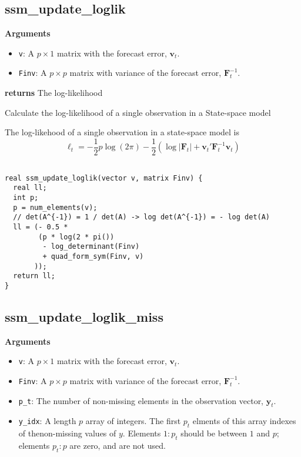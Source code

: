 \documentclass[]{book}
\providecommand{\tightlist}{%
  \setlength{\itemsep}{0pt}\setlength{\parskip}{0pt}}
\newcommand{\mat}[1]{\boldsymbol{#1}}
\renewcommand{\vec}[1]{\boldsymbol{#1}}
\begin{document}
\subsection{ssm\_update\_loglik}\label{ssm_update_loglik}

\textbf{Arguments}

\begin{itemize}
\tightlist
\item
  \texttt{v}: A \(p \times 1\) matrix with the forecast error,
  \(\vec{v}_t\).
\item
  \texttt{Finv}: A \(p \times p\) matrix with variance of the forecast
  error, \(\mat{F}^{-1}_t\).
\end{itemize}

\textbf{returns} The log-likelihood

Calculate the log-likelihood of a single observation in a State-space
model

The log-likehood of a single observation in a state-space model is \[
\ell_t = - \frac{1}{2} p \log(2 \pi) - \frac{1}{2} \left(\log|\mat{F}_t| + \vec{v}_t' \mat{F}^{-1}_t \vec{v}_t  \right)
\]

\begin{verbatim}

real ssm_update_loglik(vector v, matrix Finv) {
  real ll;
  int p;
  p = num_elements(v);
  // det(A^{-1}) = 1 / det(A) -> log det(A^{-1}) = - log det(A)
  ll = (- 0.5 *
        (p * log(2 * pi())
         - log_determinant(Finv)
         + quad_form_sym(Finv, v)
       ));
  return ll;
}

\end{verbatim}

\subsection{ssm\_update\_loglik\_miss}\label{ssm_update_loglik_miss}

\textbf{Arguments}

\begin{itemize}
\tightlist
\item
  \texttt{v}: A \(p \times 1\) matrix with the forecast error,
  \(\vec{v}_t\).
\item
  \texttt{Finv}: A \(p \times p\) matrix with variance of the forecast
  error, \(\mat{F}^{-1}_t\).
\item
  \texttt{p\_t}: The number of non-missing elements in the observation
  vector, \(\vec{y}_t\).
\item
  \texttt{y\_idx}: A length \(p\) array of integers. The first \(p_t\)
  elments of this array indexes of thenon-missing values of \(y\).
  Elements \(1:p_t\) should be between \(1\) and \(p\); elements
  \(p_t:p\) are zero, and are not used.
\end{itemize}
\end{document}
